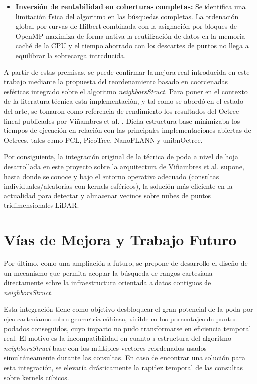 \begin{itemize}
    \item \textbf{Inversión de rentabilidad en coberturas completas:} Se identifica una limitación física del algoritmo en las búsquedas completas. La ordenación global por curvas de Hilbert combinada con la asignación por bloques de OpenMP maximiza de forma nativa la reutilización de datos en la memoria caché de la CPU y el tiempo ahorrado con los descartes de puntos no llega a equilibrar la sobrecarga introducida.
\end{itemize}

A partir de estas premisas, se puede confirmar la mejora real introducida en este trabajo mediante la propuesta del reordenamiento basado en coordenadas esféricas integrado sobre el algoritmo \textit{neighborsStruct}. Para poner en el contexto de la literatura técnica esta implementación, y tal como se abordó en el estado del arte, se tomaron como referencia de rendimiento los resultados del Octree lineal publicados por Viñambres et al. \cite{Vinambres}. Dicha estructura base minimizaba los tiempos de ejecución en relación con las principales implementaciones abiertas de Octrees, tales como PCL, PicoTree, NanoFLANN y unibnOctree. 

Por consiguiente, la integración original de la técnica de poda a nivel de hoja desarrollada en este proyecto sobre la arquitectura de Viñambres et al. supone, hasta donde se conoce y bajo el entorno operativo adecuado (consultas individuales/aleatorias con kernels esféricos), la solución más eficiente en la actualidad para detectar y almacenar vecinos sobre nubes de puntos tridimensionales LiDAR.

\section{Vías de Mejora y Trabajo Futuro}

Por último, como una ampliación a futuro, se propone de desarrollo el diseño de un mecanismo que permita acoplar la búsqueda de rangos cartesiana directamente sobre la infraestructura orientada a datos contiguos de \textit{neighborsStruct}.

Esta integración tiene como objetivo desbloquear el gran potencial de la poda por ejes cartesianos sobre geometría cúbicas, visible en los porcentajes de puntos podados conseguidos, cuyo impacto no pudo transformarse en eficiencia temporal real. El motivo es la incompatibilidad en cuanto a estructura del algoritmo \textit{neighborsStruct} base con los múltiples vectores reordenados usados simultáneamente durante las consultas. En caso de encontrar una solución para esta integración, se elevaría drásticamente la rapidez temporal de las consultas sobre kernels cúbicos.

